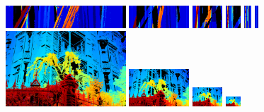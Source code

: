 \documentclass{article}
\theoremstyle{definition}
\begin{document}
\begin{figure}[th]
  \includegraphics[width=0.4\textwidth]{images/pyr/1521741442733_pyr_epi_000.png}
  \includegraphics[width=0.2\textwidth]{images/pyr/1521741442733_pyr_epi_001.png}
  \includegraphics[width=0.1\textwidth]{images/pyr/1521741442733_pyr_epi_002.png}
  \includegraphics[width=0.05\textwidth]{images/pyr/1521741442733_pyr_epi_003.png}
  \includegraphics[width=0.025\textwidth]{images/pyr/1521741442733_pyr_epi_004.png}
  \includegraphics[width=0.0125\textwidth]{images/pyr/1521741442733_pyr_epi_005.png}
  \\[0.5cm]
  \includegraphics[width=0.4\textwidth]{images/pyr/1521751973001_pyr_depth_000.png}
  \includegraphics[width=0.2\textwidth]{images/pyr/1521751973001_pyr_depth_001.png}
  \includegraphics[width=0.1\textwidth]{images/pyr/1521751973001_pyr_depth_002.png}
  \includegraphics[width=0.05\textwidth]{images/pyr/1521751973001_pyr_depth_003.png}

\end{figure}
\end{document}
